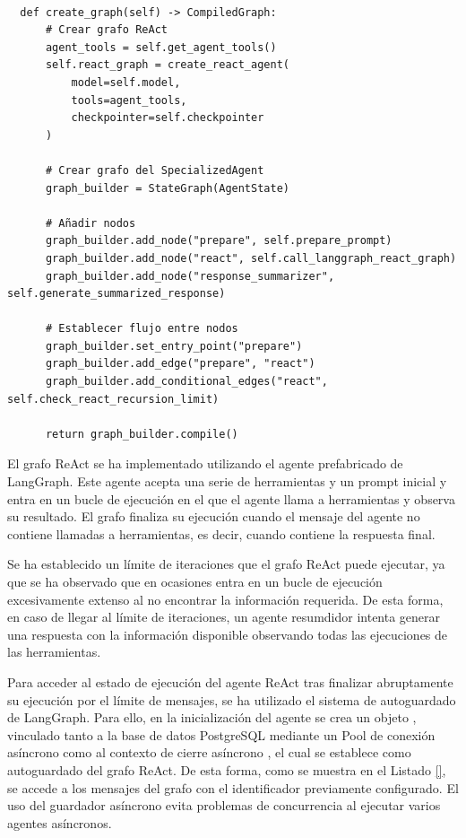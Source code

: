 \begin{lstlisting}[caption={\protect\opus{create_graph: Grafo de agentes especializados} },label={lst:spec_graph}]

  def create_graph(self) -> CompiledGraph:
      # Crear grafo ReAct
      agent_tools = self.get_agent_tools()
      self.react_graph = create_react_agent(
          model=self.model,
          tools=agent_tools,
          checkpointer=self.checkpointer
      )

      # Crear grafo del SpecializedAgent
      graph_builder = StateGraph(AgentState)

      # Añadir nodos 
      graph_builder.add_node("prepare", self.prepare_prompt)
      graph_builder.add_node("react", self.call_langgraph_react_graph)
      graph_builder.add_node("response_summarizer", self.generate_summarized_response)

      # Establecer flujo entre nodos 
      graph_builder.set_entry_point("prepare")
      graph_builder.add_edge("prepare", "react")
      graph_builder.add_conditional_edges("react", self.check_react_recursion_limit)

      return graph_builder.compile()
\end{lstlisting}

El grafo ReAct se ha implementado utilizando el agente prefabricado  de LangGraph. Este agente acepta una serie de herramientas y un prompt inicial y entra en un bucle de ejecución en el que el agente llama a herramientas y observa su resultado. El grafo finaliza su ejecución cuando el mensaje del agente no contiene llamadas a herramientas, es decir, cuando contiene la respuesta final. 

Se ha establecido un límite de iteraciones que el grafo ReAct puede ejecutar, ya que se ha observado que en ocasiones entra en un bucle de ejecución excesivamente extenso al no encontrar la información requerida. De esta forma, en caso de llegar al límite de iteraciones, un agente resumdidor intenta generar una respuesta con la información disponible observando todas las ejecuciones de las herramientas. 

Para acceder al estado de ejecución del agente ReAct tras finalizar abruptamente su ejecución por el límite de mensajes, se ha utilizado el sistema de autoguardado de LangGraph. Para ello, en la inicialización del agente se crea un objeto , vinculado tanto a la base de datos PostgreSQL mediante un Pool de conexión asíncrono como al contexto de cierre asíncrono , el cual se establece como autoguardado del grafo ReAct. De esta forma, como se muestra en el Listado \ref{}, se accede a los mensajes del grafo con el identificador previamente configurado. El uso del guardador asíncrono evita problemas de concurrencia al ejecutar varios agentes asíncronos. 

